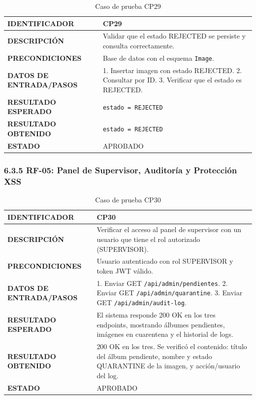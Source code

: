 \begin{table}[H]
\centering
\caption{Caso de prueba CP29}
\begin{tabular}{|p{3.5cm}|p{10.3cm}|}
\hline
\textbf{IDENTIFICADOR} & CP29 \\
\hline
\textbf{DESCRIPCIÓN} & Validar que el estado REJECTED se persiste y consulta correctamente. \\
\hline
\textbf{PRECONDICIONES} & Base de datos con el esquema \texttt{Image}. \\
\hline
\textbf{DATOS DE ENTRADA/PASOS} & 1. Insertar imagen con estado REJECTED. 2. Consultar por ID. 3. Verificar que el estado es REJECTED. \\
\hline
\textbf{RESULTADO ESPERADO} & \texttt{estado = REJECTED} \\
\hline
\textbf{RESULTADO OBTENIDO} & \texttt{estado = REJECTED} \\
\hline
\textbf{ESTADO} & APROBADO \\
\hline
\end{tabular}
\end{table}

\subsubsection{6.3.5 RF-05: Panel de Supervisor, Auditoría y Protección XSS}

\begin{table}[H]
\centering
\caption{Caso de prueba CP30}
\begin{tabular}{|p{3.5cm}|p{10.3cm}|}
\hline
\textbf{IDENTIFICADOR} & CP30 \\
\hline
\textbf{DESCRIPCIÓN} & Verificar el acceso al panel de supervisor con un usuario que tiene el rol autorizado (SUPERVISOR). \\
\hline
\textbf{PRECONDICIONES} & Usuario autenticado con rol SUPERVISOR y token JWT válido. \\
\hline
\textbf{DATOS DE ENTRADA/PASOS} & 1. Enviar GET \texttt{/api/admin/pendientes}. 2. Enviar GET \texttt{/api/admin/quarantine}. 3. Enviar GET \texttt{/api/admin/audit-log}. \\
\hline
\textbf{RESULTADO ESPERADO} & El sistema responde 200 OK en los tres endpoints, mostrando álbumes pendientes, imágenes en cuarentena y el historial de logs. \\
\hline
\textbf{RESULTADO OBTENIDO} & 200 OK en los tres. Se verificó el contenido: título del álbum pendiente, nombre y estado QUARANTINE de la imagen, y acción/usuario del log. \\
\hline
\textbf{ESTADO} & APROBADO \\
\hline
\end{tabular}
\end{table}

